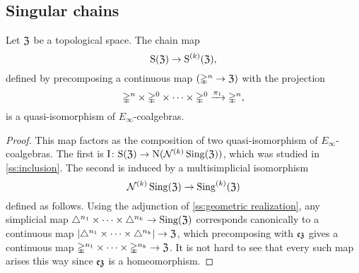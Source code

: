 \subsection{Singular chains}\label{ss:singular}

\begin{theorem}
	Let $\mathfrak{Z}$ be a topological space.
	The chain map
	\[
	\mathrm{S}(\mathfrak{Z}) \to \mathrm{S}^{(k)}(\mathfrak{Z}),
	\]
	defined by precomposing a continuous map $(\mathbb{\Delta}^n \to \mathfrak{Z})$ with the projection
	\[
	\mathbb{\Delta}^n \times \mathbb{\Delta}^{0}\times\dots\times\mathbb{\Delta}^{0} \xrightarrow{\pi_1} \mathbb{\Delta}^n,
	\]
	is a quasi-isomorphism of $E_\infty$-coalgebras.
\end{theorem}

\begin{proof}
	This map factors as the composition of two quasi-isomorphism of $E_\infty$-coalgebras.
	The first is $\operatorname{I} \colon \mathrm{S}(\mathfrak{Z}) \to \operatorname{N}(\mathcal{N}^{(k)} \operatorname{Sing}(\mathfrak{Z}))$, which was studied in \cref{ss:inclusion}.
	The second is induced by a multisimplicial isomorphism
	\[
	\mathcal{N}^{(k)} \operatorname{Sing}(\mathfrak{Z}) \to \operatorname{Sing}^{(k)}(\mathfrak{Z})
	\]
	defined as follows.
	Using the adjunction of \cref{ss:geometric realization}, any simplicial map $\triangle^{n_1}\times\dots\times\triangle^{n_k} \to \operatorname{Sing}(\mathfrak{Z})$ corresponds canonically to a continuous map $\lvert\triangle^{n_1}\times\dots\times\triangle^{n_k}\rvert \to \mathfrak{Z}$, which precomposing with $\operatorname{\mathfrak{ez}}$ gives a continuous map $\mathbb{\Delta}^{n_1}\times\dots\times\mathbb{\Delta}^{n_k} \to \mathfrak{Z}$.
	It is not hard to see that every such map arises this way since $\operatorname{\mathfrak{ez}}$ is a homeomorphism.
\end{proof}